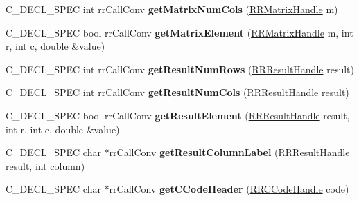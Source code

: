 \begin{DoxyCompactItemize}
\item 
\hypertarget{group__loadsave_ga46eae843e223f83e00b07fe7563a1c91}{
\-C\-\_\-\-D\-E\-C\-L\-\_\-\-S\-P\-E\-C int rr\-Call\-Conv {\bfseries get\-Matrix\-Num\-Cols} (\hyperlink{rr__c__types_8h_a87174eefa58ae98dec58c9253ae6c5da}{\-R\-R\-Matrix\-Handle} m)}
\label{group__loadsave_ga46eae843e223f83e00b07fe7563a1c91}

\item 
\hypertarget{group__loadsave_gac4bd2fdc7fd7d3a1f52ef59975952dad}{
\-C\-\_\-\-D\-E\-C\-L\-\_\-\-S\-P\-E\-C bool rr\-Call\-Conv {\bfseries get\-Matrix\-Element} (\hyperlink{rr__c__types_8h_a87174eefa58ae98dec58c9253ae6c5da}{\-R\-R\-Matrix\-Handle} m, int r, int c, double \&value)}
\label{group__loadsave_gac4bd2fdc7fd7d3a1f52ef59975952dad}

\item 
\hypertarget{group__loadsave_ga45793ae8175e37d42bb0fed8629cedb3}{
\-C\-\_\-\-D\-E\-C\-L\-\_\-\-S\-P\-E\-C int rr\-Call\-Conv {\bfseries get\-Result\-Num\-Rows} (\hyperlink{rr__c__types_8h_a8c364bbdef9aab31c89655c38461da51}{\-R\-R\-Result\-Handle} result)}
\label{group__loadsave_ga45793ae8175e37d42bb0fed8629cedb3}

\item 
\hypertarget{group__loadsave_gac8e0a87e6231d8f5828b679116b2d6a7}{
\-C\-\_\-\-D\-E\-C\-L\-\_\-\-S\-P\-E\-C int rr\-Call\-Conv {\bfseries get\-Result\-Num\-Cols} (\hyperlink{rr__c__types_8h_a8c364bbdef9aab31c89655c38461da51}{\-R\-R\-Result\-Handle} result)}
\label{group__loadsave_gac8e0a87e6231d8f5828b679116b2d6a7}

\item 
\hypertarget{group__loadsave_gab8f77529dcd45bef9ebe627b88831d52}{
\-C\-\_\-\-D\-E\-C\-L\-\_\-\-S\-P\-E\-C bool rr\-Call\-Conv {\bfseries get\-Result\-Element} (\hyperlink{rr__c__types_8h_a8c364bbdef9aab31c89655c38461da51}{\-R\-R\-Result\-Handle} result, int r, int c, double \&value)}
\label{group__loadsave_gab8f77529dcd45bef9ebe627b88831d52}

\item 
\hypertarget{group__loadsave_ga9ddbfbe25f45e7232d0526bf51147fd3}{
\-C\-\_\-\-D\-E\-C\-L\-\_\-\-S\-P\-E\-C char $\ast$rr\-Call\-Conv {\bfseries get\-Result\-Column\-Label} (\hyperlink{rr__c__types_8h_a8c364bbdef9aab31c89655c38461da51}{\-R\-R\-Result\-Handle} result, int column)}
\label{group__loadsave_ga9ddbfbe25f45e7232d0526bf51147fd3}

\item 
\hypertarget{group__loadsave_ga071cb3c138a8aaf96992daec8fd6a7c2}{
\-C\-\_\-\-D\-E\-C\-L\-\_\-\-S\-P\-E\-C char $\ast$rr\-Call\-Conv {\bfseries get\-C\-Code\-Header} (\hyperlink{rr__c__types_8h_aaaa74f20722a48f3ae9ed5bdbb6c8a86}{\-R\-R\-C\-Code\-Handle} code)}
\label{group__loadsave_ga071cb3c138a8aaf96992daec8fd6a7c2}


\end{DoxyCompactItemize}
